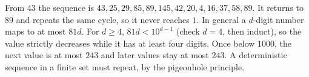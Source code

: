From $43$ the sequence is $43,25,29,85,89,145,42,20,4,16,37,58,89$. It returns to $89$ and repeats the same cycle, so it never reaches $1$. In general a $d$-digit number maps to at most $81d$. For $d\ge4$, $81d<10^{d-1}$ (check $d=4$, then induct), so the value strictly decreases while it has at least four digits. Once below $1000$, the next value is at most $243$ and later values stay at most $243$. A deterministic sequence in a finite set must repeat, by the pigeonhole principle.
